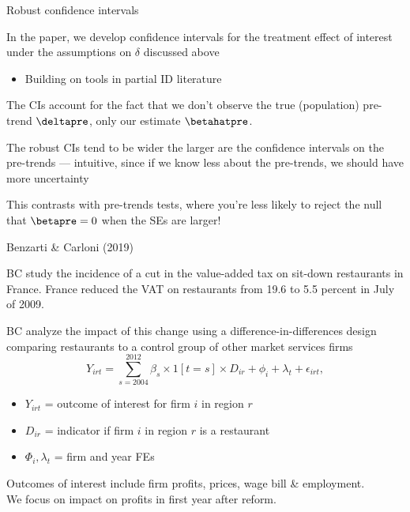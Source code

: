 \documentclass[aspectratio = 169, 13pt]{beamer}
\begin{document}
\begin{frame}{Robust confidence intervals}
	\begin{wideitemize}
		\item
		In the paper, we develop confidence intervals for the treatment effect of interest under the assumptions on $\delta$ discussed above
		\begin{itemize}
			\item 
			Building on tools in partial ID literature \citep{andrews_inference_2023, armstrong_optimal_2018}
		\end{itemize}
		
		\item
		The CIs account for the fact that we don't observe the true (population) pre-trend $\deltapre$, only our estimate $\betahatpre$. 
		
		\item
		The robust CIs tend to be wider the larger are the confidence intervals on the pre-trends --- intuitive, since if we know less about the pre-trends, we should have more uncertainty
		
		\item
		This contrasts with pre-trends tests, where you're less likely to reject the null that $\betapre =0$ when the SEs are larger!
	\end{wideitemize}
\end{frame}



\begin{frame}{Benzarti \& Carloni (2019)}
	\begin{wideitemize}
		\item
		BC study the incidence of a cut in the value-added tax on sit-down restaurants in France.
		France reduced the VAT on restaurants from 19.6 to 5.5 percent in July of 2009. 
		
		\item
		BC analyze the impact of this change using a difference-in-differences design comparing restaurants to a control group of other market services firms
		\vspace{-3mm}
		\begin{equation}
			Y_{irt} = \sum_{s = 2004}^{2012} \beta_s \times 1[t = s] \times  D_{ir} + \phi_i + \lambda_t + \epsilon_{irt} , \label{eqn: bc event-study spec}    
		\end{equation}
		\vspace{-3mm}
		\noindent 
		\begin{itemize}
			\item $Y_{irt}$ = outcome of interest for firm $i$ in region $r$
			\item $D_{ir}$ = indicator if firm $i$ in region $r$ is a restaurant
			\item $\Phi_i, \lambda_t$ = firm and year FEs
		\end{itemize}
		
		\item Outcomes of interest include firm profits, prices, wage bill \& employment.\\
		We focus on impact on profits in first year after reform.
	\end{wideitemize}
\end{frame}
\end{document}
